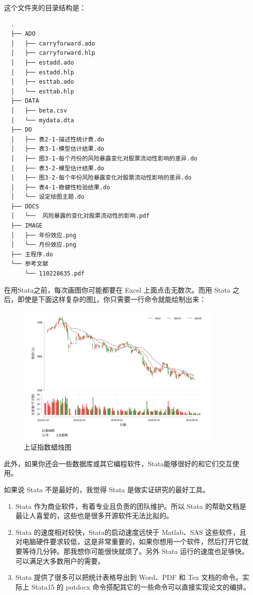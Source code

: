 这个文件夹的目录结构是：

\begin{lstlisting}
  .
  ├── ADO
  │   ├── carryforward.ado
  │   ├── carryforward.hlp
  │   ├── estadd.ado
  │   ├── estadd.hlp
  │   ├── esttab.ado
  │   └── esttab.hlp
  ├── DATA
  │   ├── beta.csv
  │   └── mydata.dta
  ├── DO
  │   ├── 表2-1-描述性统计表.do
  │   ├── 表3-1-模型估计结果.do
  │   ├── 图3-1-每个月份的风险暴露变化对股票流动性影响的差异.do
  │   ├── 表3-2-模型估计结果.do
  │   ├── 图3-2-每个年份风险暴露变化对股票流动性影响的差异.do
  │   ├── 表4-1-稳健性检验结果.do
  │   └── 设定绘图主题.do
  ├── DOCS
  │   └──  风险暴露的变化对股票流动性的影响.pdf
  ├── IMAGE
  │   ├── 年份效应.png
  │   └── 月份效应.png
  ├── 主程序.do
  └── 参考文献
      └── 110228635.pdf
\end{lstlisting}

在用Stata之前，每次画图你可能都要在 Excel 上面点击无数次。而用 Stata 之后，即使是下面这样复杂的图\ref{fig:sci}，你只需要一行命令就能绘制出来：

\begin{figure}[htbp]
  \centering \includegraphics[width=0.9\textwidth]{assets/stkpv4.png}
  \caption{上证指数蜡烛图}
  \label{fig:sci}
\end{figure}

此外，如果你还会一些数据库或其它编程软件，Stata能够很好的和它们交互使用。

如果说 Stata 不是最好的，我觉得 Stata 是做实证研究的最好工具。

\begin{enumerate}
\item  Stata 作为商业软件，有着专业且负责的团队维护。所以 Stata 的帮助文档是最让人喜爱的，这些也是很多开源软件无法比拟的。
\item  Stata 的速度相对较快，Stata的启动速度远快于 Matlab、SAS 这些软件，且对电脑硬件要求较低，这是非常重要的，如果你想用一个软件，然后打开它就要等待几分钟。那我想你可能很快就烦了。另外 Stata 运行的速度也足够快。可以满足大多数用户的需要。
\item  Stata 提供了很多可以把统计表格导出到 Word、PDF 和 Tex 文档的命令。实际上 Stata15 的 putdocx 命令搭配其它的一些命令可以直接实现论文的编排。
\end{enumerate}

